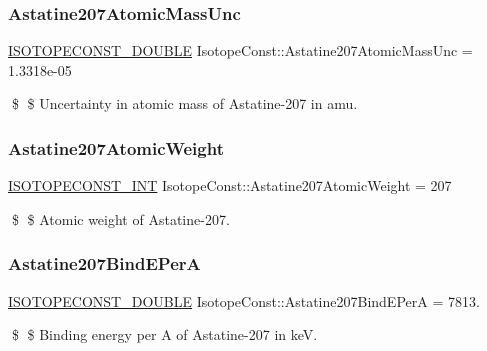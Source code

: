 \subsubsection{\texorpdfstring{Astatine207\+Atomic\+Mass\+Unc}{Astatine207AtomicMassUnc}}
{\footnotesize\ttfamily \mbox{\hyperlink{group___isotope_const-_macros_ga8f45a7272ce02c0b4c65c44636ed719a}{I\+S\+O\+T\+O\+P\+E\+C\+O\+N\+S\+T\+\_\+\+D\+O\+U\+B\+LE}} Isotope\+Const\+::\+Astatine207\+Atomic\+Mass\+Unc = 1.\+3318e-\/05}

\$ \$ Uncertainty in atomic mass of Astatine-\/207 in amu. \mbox{\label{group___isotope_const-_astatine-_at207_ga5655f884dee8f51a3c004c4508deec56}} 
\subsubsection{\texorpdfstring{Astatine207\+Atomic\+Weight}{Astatine207AtomicWeight}}
{\footnotesize\ttfamily \mbox{\hyperlink{group___isotope_const-_macros_ga5f18360b3e99483a35c32d789e62621c}{I\+S\+O\+T\+O\+P\+E\+C\+O\+N\+S\+T\+\_\+\+I\+NT}} Isotope\+Const\+::\+Astatine207\+Atomic\+Weight = 207}

\$ \$ Atomic weight of Astatine-\/207. \mbox{\label{group___isotope_const-_astatine-_at207_ga02dc2696b281df6c567f3ac0ed13c8d5}} 
\subsubsection{\texorpdfstring{Astatine207\+Bind\+E\+PerA}{Astatine207BindEPerA}}
{\footnotesize\ttfamily \mbox{\hyperlink{group___isotope_const-_macros_ga8f45a7272ce02c0b4c65c44636ed719a}{I\+S\+O\+T\+O\+P\+E\+C\+O\+N\+S\+T\+\_\+\+D\+O\+U\+B\+LE}} Isotope\+Const\+::\+Astatine207\+Bind\+E\+PerA = 7813.}

\$ \$ Binding energy per A of Astatine-\/207 in keV. \mbox{\label{group___isotope_const-_astatine-_at207_ga4ddc5a58b4ed869c3adcf20f1dbb29ca}} 
